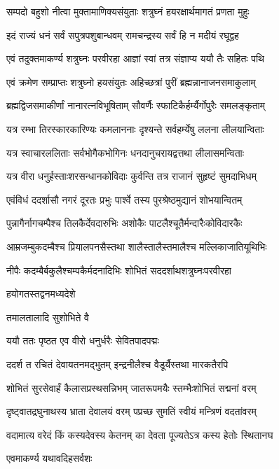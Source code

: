 \twolineshloka
{सम्पदो बहुशो नीत्वा मुक्तामाणिक्यसंयुताः}
{शत्रुघ्नं हयरक्षार्थमागतं प्रणता मुहुः}%

\twolineshloka
{इदं राज्यं धनं सर्वं सपुत्रपशुबान्धवम्}
{रामचन्द्रस्य सर्वं हि न मदीयं रघूद्वह}%

\twolineshloka
{एवं तदुक्तमाकर्ण्य शत्रुघ्नः परवीरहा}
{आज्ञां स्वां तत्र संज्ञाप्य ययौ तैः सहितः पथि}%

\twolineshloka
{एवं क्रमेण सम्प्राप्तः शत्रुघ्नो हयसंयुतः}
{अहिच्छत्रां पुरीं ब्रह्मन्नानाजनसमाकुलाम्}%

\twolineshloka
{ब्रह्मद्विजसमाकीर्णां नानारत्नविभूषिताम्}
{सौवर्णैः स्फाटिकैर्हर्म्यैर्गोपुरैः समलङ्कृताम्}%

\twolineshloka
{यत्र रम्भा तिरस्कारकारिण्यः कमलाननाः}
{दृश्यन्ते सर्वहर्म्येषु ललना लीलयान्विताः}%

\twolineshloka
{यत्र स्वाचारललिताः सर्वभोगैकभोगिनः}
{धनदानुचरायद्वत्तथा लीलासमन्विताः}%

\twolineshloka
{यत्र वीरा धनुर्हस्ताःशरसन्धानकोविदाः}
{कुर्वन्ति तत्र राजानं सुहृष्टं सुमदाभिधम्}%

\twolineshloka
{एवंविधं ददर्शासौ नगरं दूरतः प्रभुः}
{पार्श्वे तस्य पुरश्रेष्ठमुद्यानं शोभयान्वितम्}%

\twolineshloka
{पुन्नागैर्नागचम्पैश्च तिलकैर्देवदारुभिः}
{अशोकैः पाटलैश्चूतैर्मन्दारैःकोविदारकैः}%

\twolineshloka
{आम्रजम्बुकदम्बैश्च प्रियालपनसैस्तथा}
{शालैस्तालैस्तमालैश्च मल्लिकाजातियूथिभिः}%

\twolineshloka
{नीपैः कदम्बैर्बकुलैश्चम्पकैर्मदनादिभिः}
{शोभितं सददर्शाथशत्रुघ्नःपरवीरहा}%

हयोगतस्तद्वनमध्यदेशे

तमालतालादि सुशोभिते वै

\twolineshloka
{ययौ ततः पृष्ठत एव वीरो}
{धनुर्धरैः सेवितपादपद्मः}%

\twolineshloka
{ददर्श त रचितं देवायतनमद्भुतम्}
{इन्द्रनीलैश्च वैडूर्यैस्तथा मारकतैरपि}%

\twolineshloka
{शोभितं सुरसेवार्हं कैलासप्रस्थसन्निभम्}
{जातरूपमयैः स्तम्भैःशोभितं सद्मनां वरम्}%

\twolineshloka
{दृष्ट्वातद्रघुनाथस्य भ्राता देवालयं वरम्}
{पप्रच्छ सुमतिं स्वीयं मन्त्रिणं वदतांवरम्}%


\twolineshloka
{वदामात्य वरेदं किं कस्यदेवस्य केतनम्}
{का देवता पूज्यतेऽत्र कस्य हेतोः स्थितानघ}%

\onelineshloka
{एवमाकर्ण्य यथावदिहसर्वशः}%

